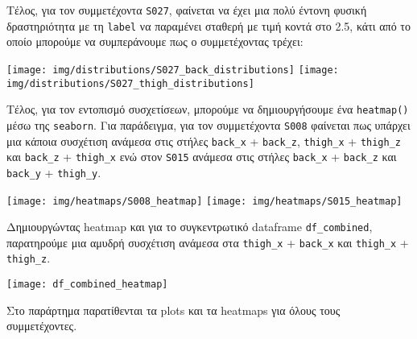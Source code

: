         Τέλος, για τον συμμετέχοντα \texttt{S027}, φαίνεται να έχει μια πολύ έντονη φυσική δραστηριότητα με τη \texttt{label}
        να παραμένει σταθερή με τιμή κοντά στο 2.5, κάτι από το οποίο μπορούμε να συμπεράνουμε πως ο συμμετέχοντας τρέχει:

        \begin{multicols}{2} \centering
            \noindent\texttt{[image: img/distributions/S027\_back\_distributions]}
            \texttt{[image: img/distributions/S027\_thigh\_distributions]}
        \end{multicols}

        Τέλος, για τον εντοπισμό συσχετίσεων, μπορούμε να δημιουργήσουμε ένα \texttt{heatmap()} μέσω της \texttt{seaborn}.
        Για παράδειγμα, για τον συμμετέχοντα \texttt{S008} φαίνεται πως υπάρχει μια κάποια συσχέτιση ανάμεσα στις στήλες \verb|back_x| + \verb|back_z|,
        \verb|thigh_x| + \verb|thigh_z| και \verb|back_z| + \verb|thigh_x| ενώ στον \texttt{S015} ανάμεσα στις στήλες \verb|back_x| + \verb|back_z| και \verb|back_y| + \verb|thigh_y|.

        \pagebreak
        \begin{multicols}{2} \centering
            \noindent\texttt{[image: img/heatmaps/S008\_heatmap]}
            \texttt{[image: img/heatmaps/S015\_heatmap]}
        \end{multicols}

        Δημιουργώντας heatmap και για το συγκεντρωτικό dataframe \verb|df_combined|, παρατηρούμε μια  αμυδρή συσχέτιση
        ανάμεσα στα \verb|thigh_x| + \verb|back_x| και \verb|thigh_x| + \verb|thigh_z|.

        \vspace{-5pt}
        \begin{center}
            \texttt{[image: df\_combined\_heatmap]}
        \end{center}

        \begin{graycomment} \centering
            Στο παράρτημα παρατίθενται τα plots και τα heatmaps για όλους τους συμμετέχοντες.
        \end{graycomment}

        \vspace{20pt}